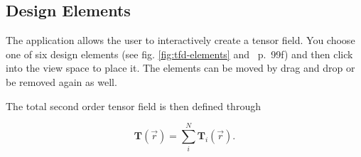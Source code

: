 \documentclass[a4paper,10pt,notitlepage]{scrartcl}
\newcommand{\mat}[1]{\mathbf{#1}}
\begin{document}
\subsection{Design Elements}

The application allows the user to interactively create a tensor field. You
choose one of six design elements (see fig. \ref{fig:tfd-elements} and
\cite{tfd}~p.~99f) and then click into the view space to place it. The
elements can be moved by drag and drop or be removed again as well.

The total second order tensor field is then defined through

\begin{equation}
 \mat{T}(\vec{r}) = \sum_i^N \mat{T}_i(\vec{r}).
 \label{eq:tf}
\end{equation}
\end{document}

